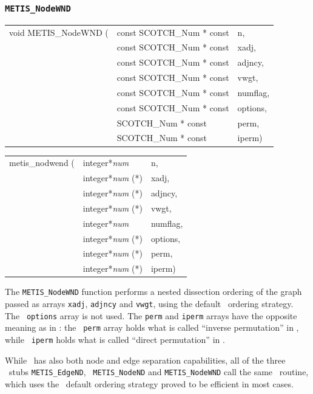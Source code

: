 \subsubsection{{\tt METIS\_NodeWND}}

\begin{itemize}
\progsyn

{\tt\begin{tabular}{l@{}ll}
void METIS\_NodeWND ( & const SCOTCH\_Num * const & n, \\
                      & const SCOTCH\_Num * const & xadj, \\
                      & const SCOTCH\_Num * const & adjncy, \\
                      & const SCOTCH\_Num * const & vwgt, \\
                      & const SCOTCH\_Num * const & numflag, \\
                      & const SCOTCH\_Num * const & options, \\
                      & SCOTCH\_Num * const       & perm, \\
                      & SCOTCH\_Num * const       & iperm)
\end{tabular}}

{\tt\begin{tabular}{l@{}ll}
metis\_nodwend ( & integer*{\it num}     & n, \\
                 & integer*{\it num} (*) & xadj, \\
                 & integer*{\it num} (*) & adjncy, \\
                 & integer*{\it num} (*) & vwgt, \\
                 & integer*{\it num}     & numflag, \\
                 & integer*{\it num} (*) & options, \\
                 & integer*{\it num} (*) & perm, \\
                 & integer*{\it num} (*) & iperm)
\end{tabular}}

\progdes

The {\tt METIS\_NodeWND} function performs a nested dissection
ordering of the graph passed as arrays {\tt xadj}, {\tt adjncy}
and {\tt vwgt}, using the default \scotch\ ordering strategy. The {\tt
options} array is not used. The {\tt perm} and {\tt iperm} arrays have
the opposite meaning as in \scotch: the \metis\ {\tt perm} array
holds what is called ``inverse permutation'' in \scotch, while {\tt
iperm} holds what is called ``direct permutation'' in \scotch.

While \scotch\ has also both node and edge separation capabilities,
all of the three \metis\ stubs {\tt METIS\_\lbo EdgeND}, {\tt
METIS\_\lbo NodeND} and {\tt METIS\_\lbo NodeWND} call the same
\scotch\ routine, which uses the \scotch\ default ordering strategy
proved to be efficient in most cases.
\end{itemize}

